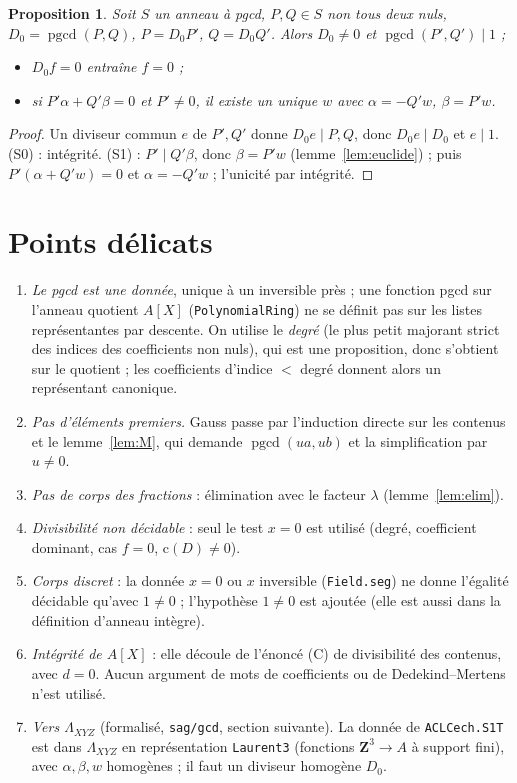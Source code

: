 \documentclass[11pt]{amsart}
\newtheorem{proposition}[theorem]{Proposition}
\theoremstyle{definition}
\theoremstyle{remark}
\newcommand{\pgcd}{\operatorname{pgcd}}
\newcommand{\cont}{\mathrm c}
\begin{document}
\begin{proposition}\label{prop:S}
Soit $S$ un anneau à pgcd, $P,Q\in S$ non tous deux nuls,
$D_0=\pgcd(P,Q)$, $P=D_0P'$, $Q=D_0Q'$. Alors $D_0\ne0$ et
$\pgcd(P',Q')\mid1$ ;
\begin{itemize}
\item[(S0)] $D_0f=0$ entraîne $f=0$ ;
\item[(S1)] si $P'\alpha+Q'\beta=0$ et $P'\ne0$, il existe un unique $w$
  avec $\alpha=-Q'w$, $\beta=P'w$.
\end{itemize}
\end{proposition}
\begin{proof}
Un diviseur commun $e$ de $P',Q'$ donne $D_0e\mid P,Q$, donc
$D_0e\mid D_0$ et $e\mid1$. (S0) : intégrité. (S1) : $P'\mid Q'\beta$,
donc $\beta=P'w$ (lemme~\ref{lem:euclide}) ; puis $P'(\alpha+Q'w)=0$ et
$\alpha=-Q'w$ ; l'unicité par intégrité.
\end{proof}

\section{Points délicats}

\begin{enumerate}
\item \emph{Le pgcd est une donnée}, unique à un inversible près ; une
  fonction pgcd sur l'anneau quotient $A[X]$ (\texttt{PolynomialRing})
  ne se définit pas sur les listes représentantes par descente. On
  utilise le \emph{degré} (le plus petit majorant strict des indices des
  coefficients non nuls), qui est une proposition, donc s'obtient sur le
  quotient ; les coefficients d'indice $<$ degré donnent alors un
  représentant canonique.
\item \emph{Pas d'éléments premiers.} Gauss passe par l'induction directe sur
  les contenus et le lemme~\ref{lem:M}, qui demande $\pgcd(ua,ub)$ et la simplification
  par $u\ne0$.
\item \emph{Pas de corps des fractions} : élimination avec le facteur
  $\lambda$ (lemme~\ref{lem:elim}).
\item \emph{Divisibilité non décidable} : seul le test $x=0$ est utilisé
  (degré, coefficient dominant, cas $f=0$, $\cont(D)\ne0$).
\item \emph{Corps discret} : la donnée \og$x=0$ ou $x$ inversible\fg{}
  (\texttt{Field.seg}) ne donne l'égalité décidable qu'avec $1\ne0$ ;
  l'hypothèse $1\ne0$ est ajoutée (elle est aussi dans la définition
  d'anneau intègre).
\item \emph{Intégrité de $A[X]$} : elle découle de l'énoncé (C)
  de divisibilité des contenus, avec $d=0$. Aucun argument de mots
  de coefficients ou de Dedekind--Mertens n'est utilisé.
\item \emph{Vers $\Lambda_{XYZ}$} (formalisé, \texttt{sag/gcd}, section suivante).
  La donnée de \texttt{ACLCech.S1T} est dans $\Lambda_{XYZ}$ en
  représentation \texttt{Laurent3} (fonctions $\mathbf Z^3\to A$ à support
  fini), avec $\alpha,\beta,w$ homogènes ; il faut un diviseur homogène
  $D_0$.
\end{enumerate}
\end{document}
